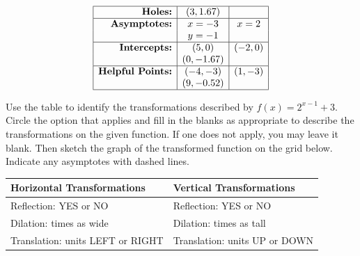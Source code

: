 \documentclass[addpoints]{exam}
\begin{document}
\begin{questions}
\begin{center}
\renewcommand{\arraystretch}{2}
\[\begin{array}{|r|c|c|} \hline \textbf{Holes:} & (3, 1.67) & \\ \hline \textbf{Asymptotes:} & x = -3 & x = 2 \\ & y = -1 & \\ \hline \textbf{Intercepts:} & (5, 0) & (-2, 0) \\ & (0, -1.67) & \\ \hline \textbf{Helpful Points:} & (-4, -3) & (1, -3) \\ & (9, -0.52) & \\ \hline \end{array}\]
\vspace{12pt}

\end{center}
\newpage

\question[3]
Use the table to identify the transformations described by \(\displaystyle{ f(x) = 2^{x - 1} + 3 }\). Circle the option that applies and fill in the blanks as appropriate to describe the transformations on the given function. If one does not apply, you may leave it blank. Then sketch the graph of the transformed function on the grid below. Indicate any asymptotes with dashed lines.\\
	\renewcommand{\arraystretch}{3} %
	\begin{center}
	\begin{tabular}{|l|l|}
		\hline
		\textbf{Horizontal Transformations}               & \textbf{Vertical Transformations}              \\ \hline
		Reflection: YES    or     NO       & Reflection:       YES    or     NO    \\ \hline
		Dilation: \underline{\hspace{2cm}} times as wide           & Dilation: \underline{\hspace{2cm}} times as tall        \\ \hline
		Translation: \underline{\hspace{2cm}} units LEFT or RIGHT & Translation: \underline{\hspace{2cm}} units UP or DOWN \\ \hline
	\end{tabular}
\end{center}
\vspace{12pt}


\end{questions}
\end{document}
